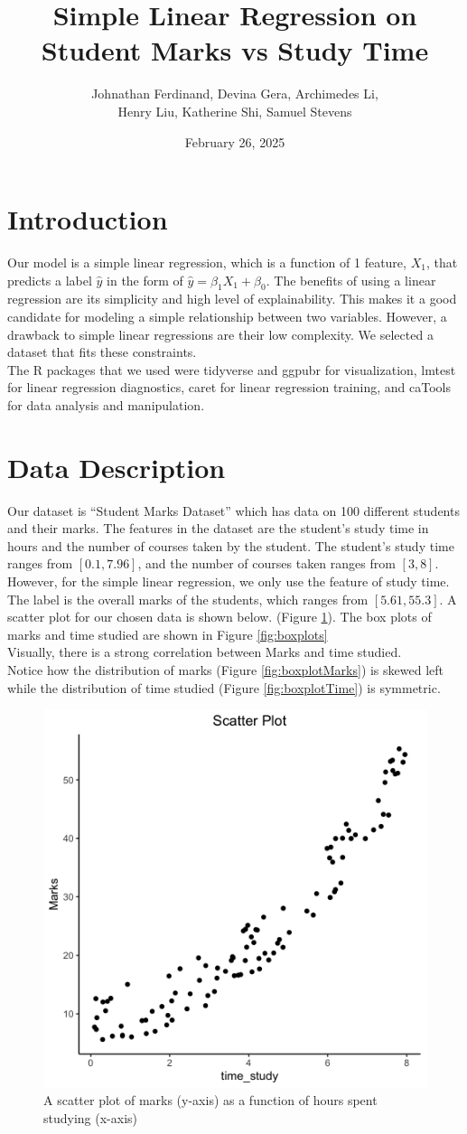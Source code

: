 \documentclass{article}
\title{Simple Linear Regression on Student Marks vs Study Time}
\author{Johnathan Ferdinand, Devina Gera, Archimedes Li, \\ Henry Liu, Katherine Shi, Samuel Stevens}
\date{February 26, 2025}
\begin{document}
\maketitle

\section{Introduction}
Our model is a simple linear regression, which is a function of 1 feature, $X_1$, that predicts a label $\hat{y}$ in the form of $\hat{y} = \beta_1X_1 + \beta_0$.  The benefits of using a linear regression are its simplicity and high level of explainability.  This makes it a good candidate for modeling a simple relationship between two variables.  However, a drawback to simple linear regressions are their low complexity.  We selected a dataset that fits these constraints. \\

\noindent The R packages that we used were tidyverse and ggpubr for visualization, lmtest for linear regression diagnostics, caret for linear regression training, and caTools for data analysis and manipulation.

\section{Data Description}
Our dataset is “Student Marks Dataset” which has data on 100 different students and their marks.  The features in the dataset are the student’s study time in hours and the number of courses taken by the student.  The student’s study time ranges from $[0.1, 7.96]$, and the number of courses taken ranges from $[3, 8]$.  However, for the simple linear regression, we only use the feature of study time.  The label is the overall marks of the students, which ranges from $[5.61, 55.3]$.  A scatter plot for our chosen data is shown below. (Figure \ref{fig:scatterplot}). The box plots of marks and time studied are shown in Figure \ref{fig:boxplots} \\
\noindent Visually, there is a strong correlation between Marks and time studied. \\

\noindent Notice how the distribution of marks (Figure \ref{fig:boxplotMarks}) is skewed left while the distribution of time studied (Figure \ref{fig:boxplotTime}) is symmetric.
\clearpage

\begin{figure}[h]
\centering
    \includegraphics[width=0.4\linewidth]{imgs/Scatter_Plot.png}
    \caption{A scatter plot of marks (y-axis) as a function of hours spent studying (x-axis) }
    \label{fig:scatterplot}
\end{figure}
\end{document}
